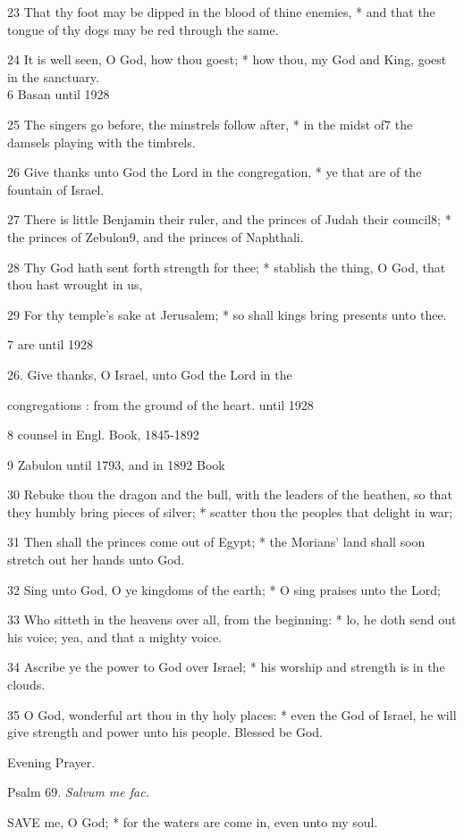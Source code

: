 23 That thy foot may be dipped in the blood of thine
enemies, * and that the tongue of thy dogs may be red through the same.

24 It is well seen, O God, how thou goest; * how thou,
my God and King, goest in the sanctuary. \\
6 Basan
until 1928

25 The singers go before, the minstrels follow after, * in the midst of7
the damsels playing with the timbrels.

26 Give thanks unto God the Lord in the congregation,
* ye that are of the fountain of Israel.

27 There is little Benjamin their ruler, and the princes
of Judah their council8; * the princes of Zebulon9,
and the princes of Naphthali.

28 Thy God hath sent forth strength for thee; * stablish
the thing, O God, that thou hast wrought in us,

29 For thy temple's sake at Jerusalem; * so shall kings
bring presents unto thee.

7 are
until 1928

26. Give thanks, O Israel, unto God the Lord in the

congregations : from the ground of the heart.
until 1928

8 counsel in
Engl. Book, 1845-1892 

9
Zabulon until
1793, and in 1892 Book

30 Rebuke thou the dragon and the bull, with the leaders of the heathen,
so that they humbly bring pieces of silver; * scatter thou the peoples
that delight in war;

31 Then shall the princes come out of Egypt; * the
Morians’ land shall soon stretch out her hands unto God.

32 Sing unto God, O ye kingdoms of the earth; * O sing
praises unto the Lord;

33 Who sitteth in the heavens over all, from the beginning:
* lo, he doth send out his voice; yea, and that a mighty voice.

34 Ascribe ye the power to God over Israel; * his worship
and strength is in the clouds.

35 O God, wonderful art thou in thy holy places: *
even the God of Israel, he will give strength and power unto his people.
Blessed be God. 

Evening
Prayer.

Psalm
69. \emph{Salvum me fac.}

SAVE
me, O God; * for the waters are come in, even unto my soul.

